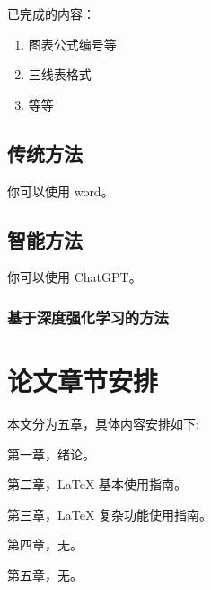 已完成的内容：

\begin{enumerate}[fullwidth,itemindent=\parindent]
    \item 图表公式编号等
    \item 三线表格式
    \item 等等
\end{enumerate}

\subsection{传统方法}

你可以使用 word。

\subsection{智能方法}

你可以使用 ChatGPT。
\subsubsection{基于深度强化学习的方法}

\section{论文章节安排}
本文分为五章，具体内容安排如下:

第一章，绪论。

第二章，LaTeX 基本使用指南。

第三章，LaTeX 复杂功能使用指南。

第四章，无。

第五章，无。

